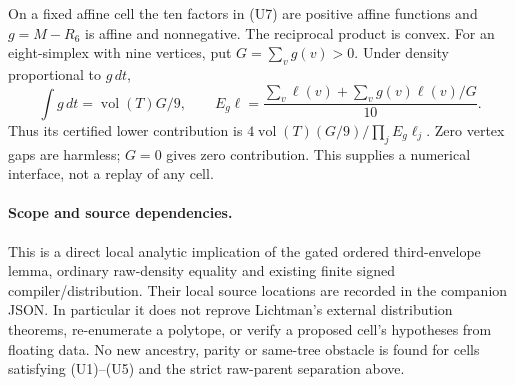 On a fixed affine cell the ten factors in (U7) are positive affine
functions and $g=M-R_6$ is affine and nonnegative. The reciprocal
product is convex. For an eight-simplex with nine vertices, put
$G=\sum_vg(v)>0$. Under density proportional to $g\,dt$,
\[
 \int g\,dt=\operatorname{vol}(T)G/9,\qquad
 E_g\ell=\frac{\sum_v\ell(v)+\sum_vg(v)\ell(v)/G}{10}.
\]
Thus its certified lower contribution is
$4\operatorname{vol}(T)(G/9)/\prod_jE_g\ell_j$.
Zero vertex gaps are harmless; $G=0$ gives zero contribution.
This supplies a numerical interface, not a replay of any cell.

\paragraph{Scope and source dependencies.}
This is a direct local analytic implication of the gated ordered
third-envelope lemma, ordinary raw-density equality and existing
finite signed compiler/distribution. Their local source locations
are recorded in the companion JSON. In particular it does not
reprove Lichtman's external distribution theorems, re-enumerate a
polytope, or verify a proposed cell's hypotheses from floating data.
No new ancestry, parity or same-tree obstacle is found for cells
satisfying (U1)--(U5) and the strict raw-parent separation above.
